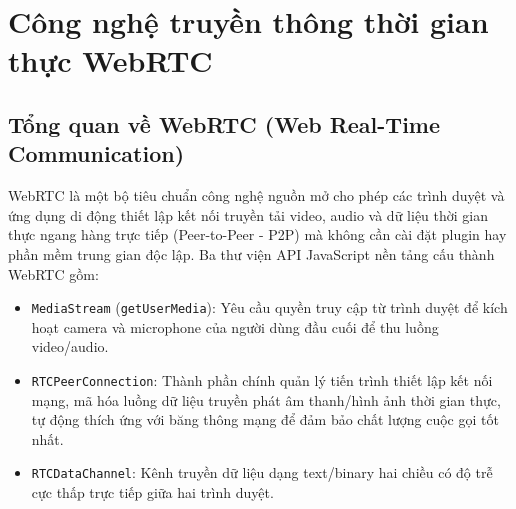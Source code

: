 \documentclass[a4paper,12pt]{report}
\begin{document}
\section{Công nghệ truyền thông thời gian thực WebRTC}

\subsection{Tổng quan về WebRTC (Web Real-Time Communication)}
WebRTC là một bộ tiêu chuẩn công nghệ nguồn mở cho phép các trình duyệt và ứng dụng di động thiết lập kết nối truyền tải video, audio và dữ liệu thời gian thực ngang hàng trực tiếp (Peer-to-Peer - P2P) mà không cần cài đặt plugin hay phần mềm trung gian độc lập. Ba thư viện API JavaScript nền tảng cấu thành WebRTC gồm:
\begin{itemize}
    \item \texttt{MediaStream} (\texttt{getUserMedia}): Yêu cầu quyền truy cập từ trình duyệt để kích hoạt camera và microphone của người dùng đầu cuối để thu luồng video/audio.
    \item \texttt{RTCPeerConnection}: Thành phần chính quản lý tiến trình thiết lập kết nối mạng, mã hóa luồng dữ liệu truyền phát âm thanh/hình ảnh thời gian thực, tự động thích ứng với băng thông mạng để đảm bảo chất lượng cuộc gọi tốt nhất.
    \item \texttt{RTCDataChannel}: Kênh truyền dữ liệu dạng text/binary hai chiều có độ trễ cực thấp trực tiếp giữa hai trình duyệt.
\end{itemize}
\end{document}
